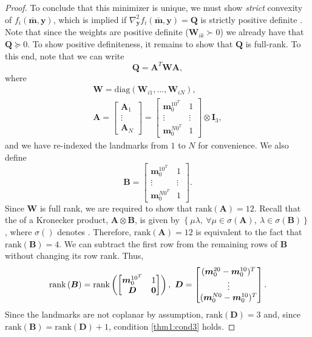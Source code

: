 \documentclass[lettersize,journal]{IEEEtran}
\newcommand{\rank}[1]{\mbox{rank}\left(#1\right)}
\newcommand{\diag}[1]{\mbox{diag}\left(#1\right)}
\newcommand{\rev}[1]{\color{red}{#1}\color{black}}
\begin{document}
\begin{proof}
To conclude that this minimizer is unique, we must show \emph{strict} convexity of $f_i(\bar{\bm{m}},\bm{y})$, which is implied if $\nabla_{\bm{y}}^2 f_i(\bar{\bm{m}},\bm{y}) = \bm{Q} $ is strictly positive definite \cite{boydConvexOptimization2004}. Note that since the weights are positive definite ($\bm{W}_{ik}\succ 0 $) we already have that $\bm{Q} \succeq 0$. To show positive definiteness, it remains to show that $\bm{Q}$ is full-rank. To this end, note that we can write
\begin{equation}
	\bm{Q} = \bm{A}^T \bm{W} \bm{A},
\end{equation}
where
\begin{gather}
	\bm{W} = \diag{\bm{W}_{i1},\ldots,\bm{W}_{iN}},\\
	\bm{A} = \begin{bmatrix}
		 \bm{A}_1 \\ \vdots \\ \bm{A}_N
	\end{bmatrix} = \begin{bmatrix}
		 \bm{m}_0^{10^T} & 1 \\
		 \vdots& \vdots\\
		 \bm{m}_0^{N0^T} & 1
	\end{bmatrix}\otimes \bm{I}_3,
\end{gather}
and we have re-indexed the landmarks from $1$ to $N$ for convenience. We also define
\begin{equation*}
	\bm{B} = \begin{bmatrix}
		\bm{m}_0^{10^T} & 1 \\
		\vdots&\vdots\\
		\bm{m}_0^{N0^T} & 1
	\end{bmatrix}.
\end{equation*}
Since $\bm{W}$ is full rank, we are required to show that $\rank{\bm{A}} = 12$. 
Recall that the \rev{singular values} of a Kronecker product, $\bm{A}\otimes\bm{B}$, is given by $\left\{ \mu\lambda,~ \forall \mu \in \sigma(\bm{A}),~ \lambda \in \sigma(\bm{B})\right\}$, where $\sigma()$ denotes \rev{the set of singular values}.
Therefore, $\rank{\bm{A}} = 12$ is equivalent to the fact that $\rank{\bm{B}}=4$. We can subtract the first row from the remaining rows of $\bm{B}$ without changing its row rank. Thus,
\begin{equation*}
	\rank{\bm{B}} = \rank{\begin{bmatrix}
			\bm{m}_0^{10^T} & 1 \\
			\bm{D} & \bm{0}
		\end{bmatrix}}, ~ \bm{D} = \begin{bmatrix}
		(\bm{m}_0^{20}-\bm{m}_0^{10})^T  \\
		\vdots\\
		(\bm{m}_0^{N0}-\bm{m}_0^{10})^T 
	\end{bmatrix}.\\	
\end{equation*}
Since the landmarks are not coplanar by assumption, $\rank{\bm{D}}=3$ and, since $\rank{\bm{B}} = \rank{\bm{D}} + 1$, condition \ref{thm1:cond3} holds.
 

\end{proof}
\end{document}
